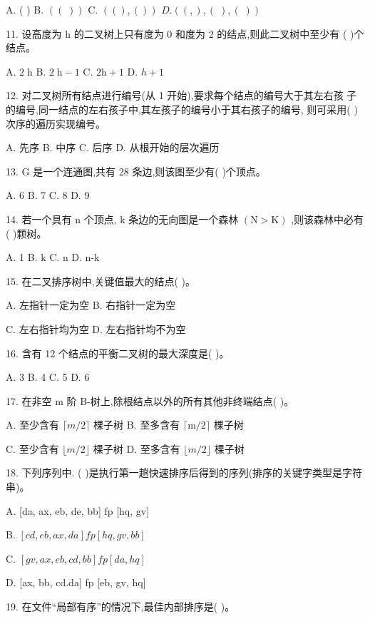 A. (   ) B. \(\left( \left( \;\right) \right)\) C. \(\left( {\left( \right) ,\left( \right) }\right)\)  \(D.\left( {\left( ,\right) ,\left( \;\right) ,\left( \;\right) }\right)\)

11. 设高度为 \(\mathrm{h}\) 的二叉树上只有度为 0 和度为 2 的结点,则此二叉树中至少有 (   )个结点。

A. \(2\mathrm{\;h}\) B. \(2\mathrm{\;h} - 1\) C. \(2\mathrm{h} + 1\) D. \(h + 1\)

12. 对二叉树所有结点进行编号(从 1 开始),要求每个结点的编号大于其左右孩 子的编号,同一结点的左右孩子中,其左孩子的编号小于其右孩子的编号, 则可采用(   )次序的遍历实现编号。

A. 先序 B. 中序 C. 后序 D. 从根开始的层次遍历

13. G 是一个连通图,共有 28 条边,则该图至少有(   )个顶点。

A. 6 B. 7 C. 8 D. 9

14. 若一个具有 \(\mathrm{n}\) 个顶点, \(\mathrm{k}\) 条边的无向图是一个森林 \(\left( {\mathrm{N} > \mathrm{K}}\right)\) ,则该森林中必有 (   )颗树。

A. 1 B. \(\mathrm{k}\) C. n D. n-k

15. 在二叉排序树中,关键值最大的结点(   )。

A. 左指针一定为空 B. 右指针一定为空

C. 左右指针均为空 D. 左右指针均不为空

16. 含有 12 个结点的平衡二叉树的最大深度是(   )。

A. 3 B. 4 C. 5 D. 6

17. 在非空 m 阶 B-树上,除根结点以外的所有其他非终端结点(   )。

A. 至少含有 \(\lceil m/2\rceil\) 棵子树 B. 至多含有 \(\lceil \mathrm{m}/2\rceil\) 棵子树

C. 至少含有 \(\lfloor m/2\rfloor\) 棵子树 D. 至多含有 \(\lfloor m/2\rfloor\) 棵子树

18. 下列序列中. (   )是执行第一趟快速排序后得到的序列(排序的关键字类型是字符串)。

A. [da, ax, eb, de, bb] fp [hq, gv]

B. \(\left\lbrack  {{cd},{eb},{ax},{da}}\right\rbrack  {fp}\left\lbrack  {{hq},{gv},{bb}}\right\rbrack\)

C. \(\left\lbrack  {{gv},{ax},{eb},{cd},{bb}}\right\rbrack  {fp}\left\lbrack  {{da},{hq}}\right\rbrack\) 

D. [ax, bb, cd.da] fp [eb, gv, hq]

19. 在文件“局部有序”的情况下,最佳内部排序是(   )。

